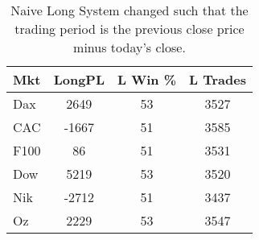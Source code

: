 \begin{table}[ht]
\centering
\caption[Naive Long System - - Close to Close]{Naive Long System changed such that the trading period is the previous close price minus today's close.} 
\label{tab:nlng_results_2}
\begin{tabular}{lccc}
  \toprule Mkt & LongPL & L Win \% & L Trades \\ 
  \midrule Dax & 2649 & 53 & 3527 \\ 
  CAC & -1667 & 51 & 3585 \\ 
  F100 & 86 & 51 & 3531 \\ 
  Dow & 5219 & 53 & 3520 \\ 
  Nik & -2712 & 51 & 3437 \\ 
  Oz & 2229 & 53 & 3547 \\ 
   \bottomrule \end{tabular}
\end{table}
